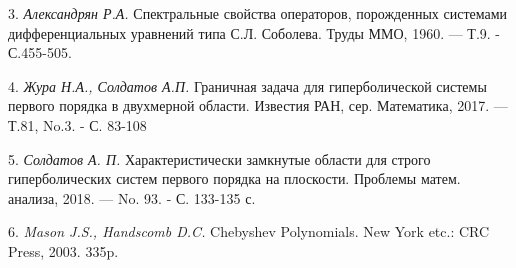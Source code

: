 3. {\it Александрян Р.А.} Спектральные свойства операторов, порожденных системами дифференциальных уравнений типа С.Л. Соболева. Труды ММО, 1960. — Т.9. - С.455-505.

4. {\it Жура Н.А., Солдатов А.П.} Граничная задача для гиперболической системы первого порядка в двухмерной области. Известия РАН, сер. Математика, 2017. — Т.81, No.3. - С. 83-108

5. {\it Солдатов А. П.} Характеристически замкнутые области для строго гиперболических систем первого порядка на плоскости. Проблемы матем. анализа, 2018. — No. 93. - С. 133-135 с.

6. {\it Mason J.S., Handscomb D.C.} Chebyshev Polynomials. New York etc.: CRC Press, 2003. 335p.


